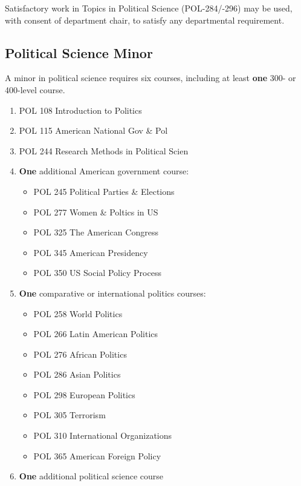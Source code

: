 \documentclass[
  letterpaper,
]{scrbook}
\providecommand{\tightlist}{%
  \setlength{\itemsep}{0pt}\setlength{\parskip}{0pt}}
\begin{document}
Satisfactory work in Topics in Political Science (POL-284/-296) may be
used, with consent of department chair, to satisfy any departmental
requirement.

\subsection{Political Science Minor}\label{political-science-minor}

A minor in political science requires six courses, including at least
\textbf{one} 300- or 400-level course.

\begin{enumerate}
\def\labelenumi{\arabic{enumi}.}
\tightlist
\item
  POL 108 Introduction to Politics
\item
  POL 115 American National Gov \& Pol
\item
  POL 244 Research Methods in Political Scien\\
\item
  \textbf{One} additional American government course:

  \begin{itemize}
  \tightlist
  \item
    POL 245 Political Parties \& Elections\\
  \item
    POL 277 Women \& Poltics in US\\
  \item
    POL 325 The American Congress\\
  \item
    POL 345 American Presidency\\
  \item
    POL 350 US Social Policy Process\\
  \end{itemize}
\item
  \textbf{One} comparative or international politics courses:

  \begin{itemize}
  \tightlist
  \item
    POL 258 World Politics\\
  \item
    POL 266 Latin American Politics\\
  \item
    POL 276 African Politics\\
  \item
    POL 286 Asian Politics\\
  \item
    POL 298 European Politics\\
  \item
    POL 305 Terrorism\\
  \item
    POL 310 International Organizations\\
  \item
    POL 365 American Foreign Policy\\
  \end{itemize}
\item
  \textbf{One} additional political science course
\end{enumerate}
\end{document}
